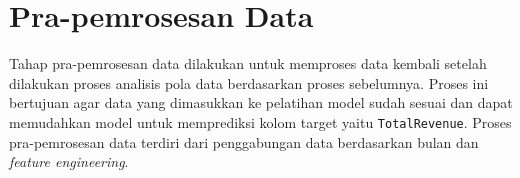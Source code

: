 


\section{Pra-pemrosesan Data}
Tahap pra-pemrosesan data dilakukan untuk memproses data kembali setelah dilakukan proses analisis pola data berdasarkan proses sebelumnya. Proses ini bertujuan agar data yang dimasukkan ke pelatihan model sudah sesuai dan dapat memudahkan model untuk memprediksi kolom target yaitu  \texttt{TotalRevenue}. Proses pra-pemrosesan data terdiri dari penggabungan data berdasarkan bulan dan \textit{feature engineering}.

